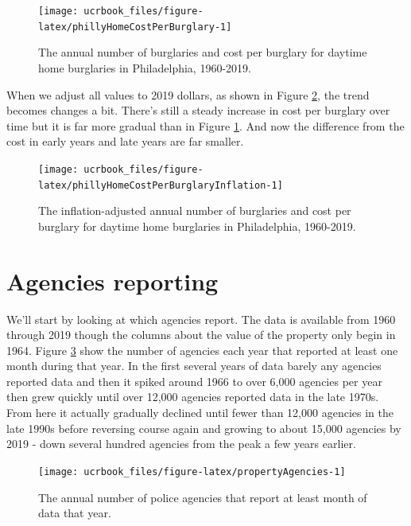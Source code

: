 \documentclass[
  12pt,
  openany]{book}
\begin{document}
\begin{figure}

{\centering \texttt{[image: ucrbook\_files/figure-latex/phillyHomeCostPerBurglary-1]} 

}

\caption{The annual number of burglaries and cost per burglary for daytime home burglaries in Philadelphia, 1960-2019.}\label{fig:phillyHomeCostPerBurglary}
\end{figure}

When we adjust all values to 2019 dollars, as shown in Figure \ref{fig:phillyHomeCostPerBurglaryInflation}, the trend becomes changes a bit. There's still a steady increase in cost per burglary over time but it is far more gradual than in Figure \ref{fig:phillyHomeCostPerBurglary}. And now the difference from the cost in early years and late years are far smaller.

\begin{figure}

{\centering \texttt{[image: ucrbook\_files/figure-latex/phillyHomeCostPerBurglaryInflation-1]} 

}

\caption{The inflation-adjusted annual number of burglaries and cost per burglary for daytime home burglaries in Philadelphia, 1960-2019.}\label{fig:phillyHomeCostPerBurglaryInflation}
\end{figure}

\hypertarget{agencies-reporting-1}{%
\section{Agencies reporting}\label{agencies-reporting-1}}

We'll start by looking at which agencies report. The data is available from 1960 through 2019 though the columns about the value of the property only begin in 1964. Figure \ref{fig:propertyAgencies} show the number of agencies each year that reported at least one month during that year. In the first several years of data barely any agencies reported data and then it spiked around 1966 to over 6,000 agencies per year then grew quickly until over 12,000 agencies reported data in the late 1970s. From here it actually gradually declined until fewer than 12,000 agencies in the late 1990s before reversing course again and growing to about 15,000 agencies by 2019 - down several hundred agencies from the peak a few years earlier.

\begin{figure}

{\centering \texttt{[image: ucrbook\_files/figure-latex/propertyAgencies-1]} 

}

\caption{The annual number of police agencies that report at least month of data that year.}\label{fig:propertyAgencies}
\end{figure}
\end{document}
